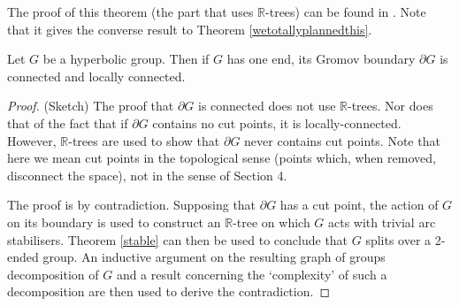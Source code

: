 The proof of this theorem (the part that uses $\mathbb{R}$-trees) can be found in \cite{S96}. Note that it gives the converse result to Theorem \ref{wetotallyplannedthis}.
\begin{theorem}
\label{twinning}
    Let $G$ be a hyperbolic group. Then if $G$ has one end, its Gromov boundary $\partial G$ is connected and locally connected.
\end{theorem}

\begin{proof}
    (Sketch) The proof that $\partial G$ is connected does not use $\mathbb{R}$-trees. Nor does that of the fact that if $\partial G$ contains no cut points, it is locally-connected. However, $\mathbb{R}$-trees are used to show that $\partial G$ never contains cut points. Note that here we mean cut points in the topological sense (points which, when removed, disconnect the space), not in the sense of Section 4.
    
    The proof is by contradiction. Supposing that $\partial G$ has a cut point, the action of $G$ on its boundary is used to construct an $\mathbb{R}$-tree on which $G$ acts with trivial arc stabilisers. Theorem \ref{stable} can then be used to conclude that $G$ splits over a 2-ended group. An inductive argument on the resulting graph of groups decomposition of $G$ and a result concerning the `complexity' of such a decomposition are then used to derive the contradiction.
\end{proof}









